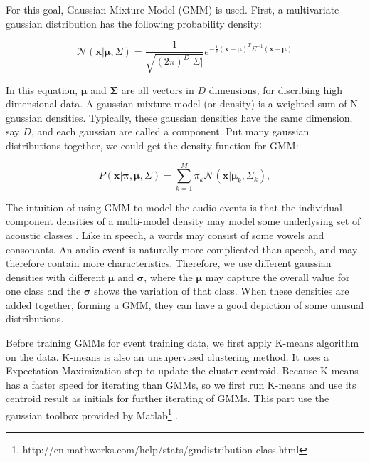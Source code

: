 For this goal, Gaussian Mixture Model (GMM) is used. 
First, a multivariate gaussian distribution has the following probability density:

\begin{equation}
 \mathcal{N}(\mathbf{x}| \mathbf{\mu}, \Sigma) = 
\frac{1}{\sqrt{(2\pi)^D|\Sigma|}}e^{-\frac{1}{2}(\mathbf{x}-\mathbf{\mu})^T \Sigma^{-1} (\mathbf{x}-\mathbf{\mu})}
\end{equation}

In this equation, $\mathbf{\mu}$ and $\mathbf{\Sigma}$ are all vectors in $D$ dimensions, for discribing high dimensional data. 
A gaussian mixture model (or density) is a weighted sum of N gaussian densities. 
Typically, these gaussian densities have the same dimension, say $D$, and each gaussian are called a component.  
Put many gaussian distributions together, we could get the density function for GMM: 

\begin{equation}
P(\mathbf{x}|\mathbf{\pi},\mathbf{\mu},\Sigma) = \sum_{k = 1}^{M} \pi_k
\mathcal{N}(\mathbf{x}|\mathbf{\mu}_k, \Sigma_k),
\end{equation} 

The intuition of using GMM to model the audio events is that the individual component densities of a multi-model density may model some underlysing set of acoustic classes \cite{reynolds1995robust}. 
Like in speech, a words may consist of some vowels and consonants. 
An audio event is naturally more complicated than speech, and may therefore contain more characteristics. 
Therefore, we use different gaussian densities with different $\mathbf{\mu}$ and $\mathbf\sigma$, where the $\mathbf\mu$ may capture the overall value for one class and the $\mathbf\sigma$ shows the variation of that class.  
When these densities are added together, forming a GMM, they can have a good depiction of some unusual distributions. 

Before training GMMs for event training data, we first apply K-means algorithm on the data. 
K-means is also an unsupervised clustering method. 
It uses a Expectation-Maximization step to update the cluster centroid. 
Because K-means has a faster speed for iterating than GMMs, so we first run K-means and use its centroid result as initials for further iterating of GMMs. 
This part use the gaussian toolbox provided by Matlab\footnote{http://cn.mathworks.com/help/stats/gmdistribution-class.html} . 


